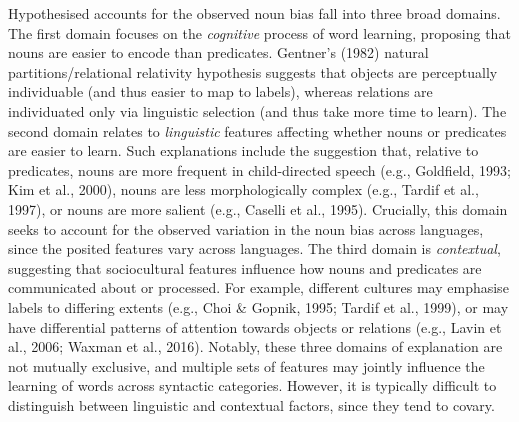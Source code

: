 \documentclass[10pt, letterpaper]{article}
\begin{document}
Hypothesised accounts for the observed noun bias fall into three broad
domains. The first domain focuses on the \emph{cognitive} process of
word learning, proposing that nouns are easier to encode than
predicates. Gentner's (1982) natural partitions/relational relativity
hypothesis suggests that objects are perceptually individuable (and thus
easier to map to labels), whereas relations are individuated only via
linguistic selection (and thus take more time to learn). The second
domain relates to \emph{linguistic} features affecting whether nouns or
predicates are easier to learn. Such explanations include the suggestion
that, relative to predicates, nouns are more frequent in child-directed
speech (e.g., Goldfield, 1993; Kim et al., 2000), nouns are less
morphologically complex (e.g., Tardif et al., 1997), or nouns are more
salient (e.g., Caselli et al., 1995). Crucially, this domain seeks to
account for the observed variation in the noun bias across languages,
since the posited features vary across languages. The third domain is
\emph{contextual}, suggesting that sociocultural features influence how
nouns and predicates are communicated about or processed. For example,
different cultures may emphasise labels to differing extents (e.g., Choi
\& Gopnik, 1995; Tardif et al., 1999), or may have differential patterns
of attention towards objects or relations (e.g., Lavin et al., 2006;
Waxman et al., 2016). Notably, these three domains of explanation are
not mutually exclusive, and multiple sets of features may jointly
influence the learning of words across syntactic categories. However, it
is typically difficult to distinguish between linguistic and contextual
factors, since they tend to covary.
\end{document}
